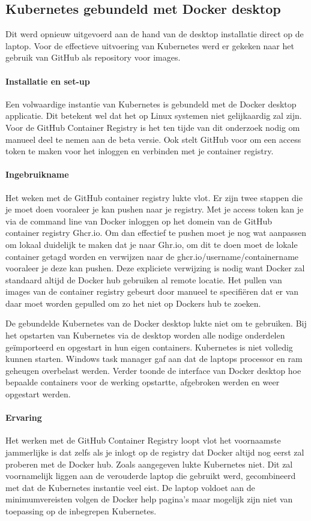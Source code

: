\subsection{Kubernetes gebundeld met Docker desktop}
Dit werd opnieuw uitgevoerd aan de hand van de desktop installatie direct op de laptop. Voor de effectieve uitvoering van Kubernetes werd er gekeken naar het gebruik van GitHub als repository voor images.
\paragraph{Installatie en set-up}
Een volwaardige instantie van Kubernetes is gebundeld met de Docker desktop applicatie. Dit betekent wel dat het op Linux systemen niet gelijkaardig zal zijn.
Voor de GitHub Container Registry is het ten tijde van dit onderzoek nodig om manueel deel te nemen aan de beta versie. Ook stelt GitHub voor om een access token te maken voor het inloggen en verbinden met je container registry.

\paragraph{Ingebruikname}
Het weken met de GitHub container registry lukte vlot. Er zijn twee stappen die je moet doen vooraleer je kan pushen naar je registry. Met je access token kan je via de command line van Docker inloggen op het domein van de GitHub container registry Ghcr.io. Om dan effectief te pushen moet je nog wat aanpassen om lokaal duidelijk te maken dat je naar Ghr.io, om dit te doen moet de lokale container getagd worden en verwijzen naar de ghcr.io/username/containername vooraleer je deze kan pushen. Deze expliciete verwijzing is nodig want Docker zal standaard altijd de Docker hub gebruiken al remote locatie. Het pullen van images van de container registry gebeurt door manueel te specifiëren dat er van daar moet worden gepulled om zo het niet op Dockers hub te zoeken.

De gebundelde Kubernetes van de Docker desktop lukte niet om te gebruiken. Bij het opstarten van Kubernetes via de desktop worden alle nodige onderdelen geïmporteerd en opgestart in hun eigen containers. Kubernetes is niet volledig kunnen starten. Windows task manager gaf aan dat de laptops processor en ram geheugen overbelast werden. Verder toonde de interface van Docker desktop hoe bepaalde containers voor de werking opstartte, afgebroken werden en weer opgestart werden.

\paragraph{Ervaring}
Het werken met de GitHub Container Registry loopt vlot het voornaamste jammerlijke is dat zelfs als je inlogt op de registry dat Docker altijd nog eerst zal proberen met de Docker hub.
Zoals aangegeven lukte Kubernetes niet. Dit zal voornamelijk liggen aan de verouderde laptop die gebruikt werd, gecombineerd met dat de Kubernetes instantie veel eist. De laptop voldoet aan de minimumvereisten volgen de Docker help pagina’s maar mogelijk zijn niet van toepassing op de inbegrepen Kubernetes.  


